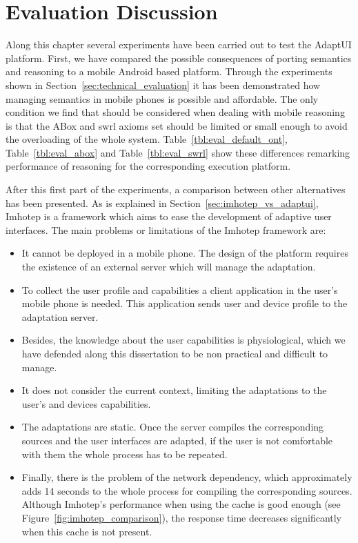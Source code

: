 \section{Evaluation Discussion}
\label{sec:evaluation_discussion}

Along this chapter several experiments have been carried out to test the AdaptUI
platform. First, we have compared the possible consequences of porting semantics
and reasoning to a mobile Android based platform. Through the experiments shown 
in Section~\ref{sec:technical_evaluation} it has been demonstrated how managing 
semantics in mobile phones is possible and affordable. The only condition we 
find that should be considered when dealing with mobile reasoning is that the 
ABox and \ac{swrl} axioms set should be limited or small enough to avoid the 
overloading of the whole system. Table~\ref{tbl:eval_default_ont},
Table~\ref{tbl:eval_abox} and Table~\ref{tbl:eval_swrl} show these differences 
remarking performance of reasoning for the corresponding execution platform.

After this first part of the experiments, a comparison between other 
alternatives has been presented. As is explained in 
Section~\ref{sec:imhotep_vs_adaptui}, Imhotep is a framework which aims to ease 
the development of adaptive user interfaces. The main problems or limitations 
of the Imhotep framework are: 

\begin{itemize}
  \item It cannot be deployed in a mobile phone. The design of the platform
  requires the existence of an external server which will manage the adaptation.
  
  \item To collect the user profile and capabilities a client application in
  the user's mobile phone is needed. This application sends user and device
  profile to the adaptation server.
  
  \item Besides, the knowledge about the user capabilities is physiological,
  which we have defended along this dissertation to be non practical and 
difficult
  to manage.
  
  \item It does not consider the current context, limiting the adaptations
  to the user's and devices capabilities.
  
  \item The adaptations are static. Once the server compiles the corresponding
  sources and the user interfaces are adapted, if the user is not comfortable
  with them the whole process has to be repeated.
  
  \item Finally, there is the problem of the network dependency, which 
  approximately adds 14 seconds to the whole process for compiling the 
  corresponding sources. Although Imhotep's performance when using the cache is 
  good enough (see Figure~\ref{fig:imhotep_comparison}), the response time 
  decreases significantly  when this cache is not present.
\end{itemize}


